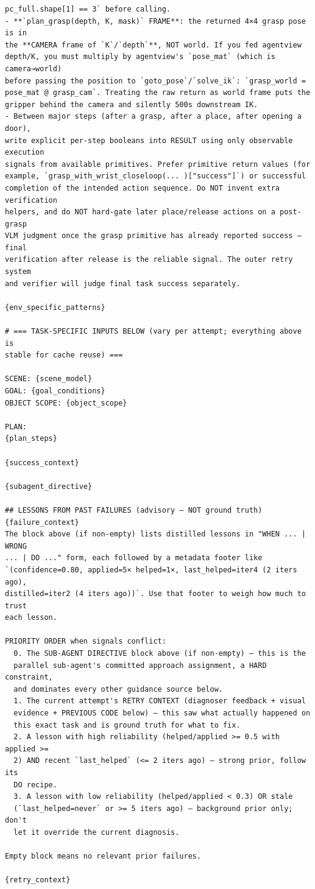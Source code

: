 \begin{lstlisting}[style=ratsappendixprompt]
pc_full.shape[1] == 3` before calling.
- **`plan_grasp(depth, K, mask)` FRAME**: the returned 4×4 grasp pose is in
the **CAMERA frame of `K`/`depth`**, NOT world. If you fed agentview
depth/K, you must multiply by agentview's `pose_mat` (which is camera→world)
before passing the position to `goto_pose`/`solve_ik`: `grasp_world =
pose_mat @ grasp_cam`. Treating the raw return as world frame puts the
gripper behind the camera and silently 500s downstream IK.
- Between major steps (after a grasp, after a place, after opening a door),
write explicit per-step booleans into RESULT using only observable execution
signals from available primitives. Prefer primitive return values (for
example, `grasp_with_wrist_closeloop(... )["success"]`) or successful
completion of the intended action sequence. Do NOT invent extra verification
helpers, and do NOT hard-gate later place/release actions on a post-grasp
VLM judgment once the grasp primitive has already reported success — final
verification after release is the reliable signal. The outer retry system
and verifier will judge final task success separately.

{env_specific_patterns}

# === TASK-SPECIFIC INPUTS BELOW (vary per attempt; everything above is
stable for cache reuse) ===

SCENE: {scene_model}
GOAL: {goal_conditions}
OBJECT SCOPE: {object_scope}

PLAN:
{plan_steps}

{success_context}

{subagent_directive}

## LESSONS FROM PAST FAILURES (advisory — NOT ground truth)
{failure_context}
The block above (if non-empty) lists distilled lessons in "WHEN ... | WRONG
... | DO ..." form, each followed by a metadata footer like
`(confidence=0.80, applied=5× helped=1×, last_helped=iter4 (2 iters ago),
distilled=iter2 (4 iters ago))`. Use that footer to weigh how much to trust
each lesson.

PRIORITY ORDER when signals conflict:
  0. The SUB-AGENT DIRECTIVE block above (if non-empty) — this is the
  parallel sub-agent's committed approach assignment, a HARD constraint,
  and dominates every other guidance source below.
  1. The current attempt's RETRY CONTEXT (diagnoser feedback + visual
  evidence + PREVIOUS CODE below) — this saw what actually happened on
  this exact task and is ground truth for what to fix.
  2. A lesson with high reliability (helped/applied >= 0.5 with applied >=
  2) AND recent `last_helped` (<= 2 iters ago) — strong prior, follow its
  DO recipe.
  3. A lesson with low reliability (helped/applied < 0.3) OR stale
  (`last_helped=never` or >= 5 iters ago) — background prior only; don't
  let it override the current diagnosis.

Empty block means no relevant prior failures.

{retry_context}

\end{lstlisting}

